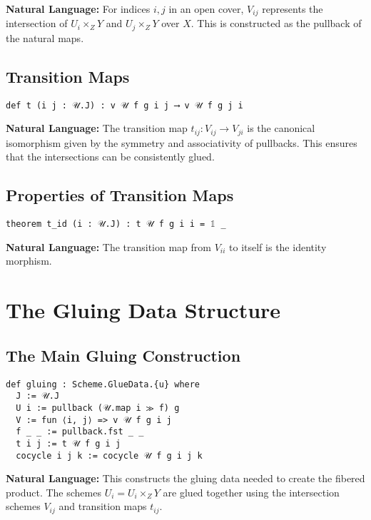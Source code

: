\documentclass{article}
\theoremstyle{definition}
\begin{document}
\textbf{Natural Language:} For indices $i, j$ in an open cover, $V_{ij}$ represents the intersection of $U_i \times_Z Y$ and $U_j \times_Z Y$ over $X$. This is constructed as the pullback of the natural maps.

\subsection{Transition Maps}

\begin{lstlisting}
def t (i j : 𝒰.J) : v 𝒰 f g i j ⟶ v 𝒰 f g j i
\end{lstlisting}

\textbf{Natural Language:} The transition map $t_{ij}: V_{ij} \to V_{ji}$ is the canonical isomorphism given by the symmetry and associativity of pullbacks. This ensures that the intersections can be consistently glued.

\subsection{Properties of Transition Maps}

\begin{lstlisting}
theorem t_id (i : 𝒰.J) : t 𝒰 f g i i = 𝟙 _
\end{lstlisting}

\textbf{Natural Language:} The transition map from $V_{ii}$ to itself is the identity morphism.

\section{The Gluing Data Structure}

\subsection{The Main Gluing Construction}

\begin{lstlisting}
def gluing : Scheme.GlueData.{u} where
  J := 𝒰.J
  U i := pullback (𝒰.map i ≫ f) g
  V := fun ⟨i, j⟩ => v 𝒰 f g i j
  f _ _ := pullback.fst _ _
  t i j := t 𝒰 f g i j
  cocycle i j k := cocycle 𝒰 f g i j k
\end{lstlisting}

\textbf{Natural Language:} This constructs the gluing data needed to create the fibered product. The schemes $U_i = U_i \times_Z Y$ are glued together using the intersection schemes $V_{ij}$ and transition maps $t_{ij}$.
\end{document}
